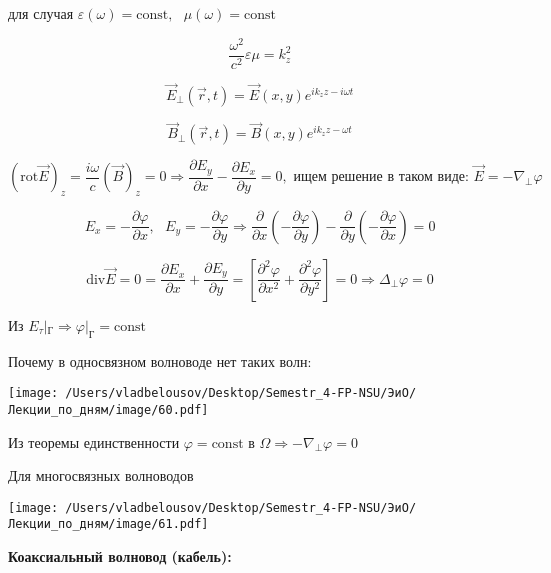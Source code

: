 \documentclass[12pt, a4paper]{report}
\begin{document}
\begin{center}
    для случая \( \varepsilon (\omega )= \mathrm{const}, \text{ } \mu( \omega ) = \mathrm{const}     \) 
\end{center}

\[ \frac{ \omega ^2 }{c ^2 } \varepsilon \mu = k_z ^2   \]

\[ \vec{E } _{\perp  }( \vec{r }, t      ) = \vec{E } (x,y )e^{ i k_z z - i \omega t }   \] 

\[ \vec{B } _{\perp  }(\vec{r } ,t ) = \vec{B } (x,y )e^{ i k_z z - \omega t}   \] 

\[ \left( \mathrm{rot }   \vec{E }  \right)_{z }  = \frac{ i \omega }{c } (\vec{B } )_z = 0 \Rightarrow \frac{\partial  E_y } {\partial  x } - \frac{ \partial  E_x }{\partial  y} = 0 , \text{  ищем решение в таком виде:  } \vec{E} = - \nabla_{ \perp }  \varphi     \] 

\[ E_x = - \frac{\partial  \varphi }{\partial x }, \text{  } E_y = - \frac{\partial  \varphi}{\partial  y } \Rightarrow \frac{ \partial  }{\partial  x }\left( - \frac{\partial  \varphi }{\partial  y }  \right)    - \frac{ \partial  }{\partial y  }\left( - \frac{\partial  \varphi }{\partial  x }  \right) = 0 \] 

\[ \mathrm{div } \vec{E } = 0 = \frac{\partial  E_x }{\partial  x } + \frac{\partial  E_y }{\partial  y }  = \left[ \frac{\partial  ^2 \varphi }{\partial  x ^2 }+ \frac{\partial  ^2 \varphi }{\partial  y ^2 }   \right] = 0 \Rightarrow \Delta_{\perp  }  \varphi =0   \] 

Из \( E_{\tau } | _{\text{Г} }  \Rightarrow \varphi|_{\text{Г} } = \mathrm{const}     \) 

Почему в односвязном волноводе нет таких волн: 

\begin{center}
    \texttt{[image: /Users/vladbelousov/Desktop/Semestr\_4-FP-NSU/ЭиО/Лекции\_по\_дням/image/60.pdf]}
\end{center}

Из теоремы единственности \( \varphi     = \mathrm{const}   \) в \( \Omega  \Rightarrow - \nabla _{ \perp } \varphi = 0\) 

Для многосвязных волноводов

\begin{center}
    \texttt{[image: /Users/vladbelousov/Desktop/Semestr\_4-FP-NSU/ЭиО/Лекции\_по\_дням/image/61.pdf]}
\end{center}

\textbf{Коаксиальный волновод (кабель):} 
\end{document}
